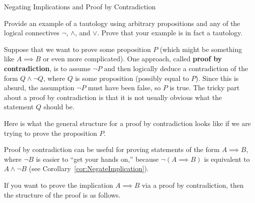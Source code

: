 \begin{section}{Negating Implications and Proof by Contradiction}
\begin{exercise}
Provide an example of a tautology using arbitrary propositions and any of the logical connectives $\neg$, $\wedge$, and $\vee$.  Prove that your example is in fact a tautology.
\end{exercise}

Suppose that we want to prove some proposition $P$ (which might be something like $A\implies B$ or even more complicated).  One approach, called \textbf{proof by contradiction}, is to assume $\neg P$ and then logically deduce a contradiction of the form $Q\wedge \neg Q$, where $Q$ is some proposition (possibly equal to $P$).  Since this is absurd, the assumption $\neg P$ must have been false, so $P$ is true.  The tricky part about a proof by contradiction is that it is not usually obvious what the statement $Q$ should be.

\begin{skeleton}
Here is what the general structure for a proof by contradiction looks like if we are trying to prove the proposition $P$.

\begin{center}
\end{center}
\end{skeleton}

Proof by contradiction can be useful for proving statements of the form $A\implies B$, where $\neg B$ is easier to ``get your hands on,'' because $\neg(A \implies B)$ is equivalent to $A \wedge \neg B$ (see Corollary~\ref{cor:NegateImplication}).

\begin{skeleton}\label{pf by contradiction for implication}
If you want to prove the implication $A\implies B$ via a proof by contradiction, then the structure of the proof is as follows.


\end{skeleton}
\end{section}
